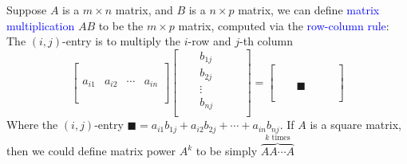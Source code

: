 \documentclass{beamer}
\theoremstyle{definition}
\theoremstyle{remark}
\begin{document}
\begin{frame}[t]
\begin{definition}
Suppose $A$ is a $m\times n$ matrix, and $B$ is a $n\times p$ matrix, we can define \textcolor{blue}{matrix multiplication} $AB$ to be the $m\times p$ matrix, computed via the \textcolor{blue}{row-column rule}:\pause
The $(i,j)$-entry is to multiply the $i$-row and $j$-th column
\[
\begin{bmatrix}
\\
\\
\\
a_{i1}&a_{i2}&\cdots &a_{in}\\
\\
\\
\end{bmatrix}\begin{bmatrix}
&&b_{1j}&&&\\
&&b_{2j}&&&\\
&&\vdots&&&\\
&&b_{nj}&&&\\
\end{bmatrix}=\begin{bmatrix}
&&&&&\\
&&&&&\\
&&&&&\\
&&\blacksquare&&\\
&&&&&\\
&&&&&
\end{bmatrix}
\]
Where the $(i,j)$-entry $\blacksquare=a_{i1}b_{1j}+a_{i2}b_{2j}+\cdots+a_{in}b_{nj}$.
\pause
If $A$ is a square matrix, then we could define matrix power $A^k$ to be simply $\overbrace{AA\cdots A}^{k\text{ times}}$
\end{definition}
\end{frame}
\end{document}
